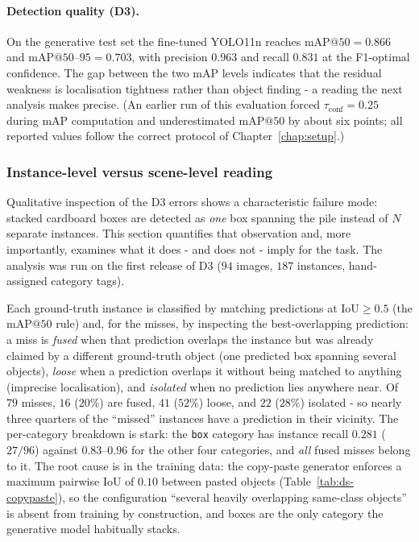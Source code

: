 \paragraph{Detection quality (D3).} On the generative test set the fine-tuned
YOLO11n reaches mAP$@50 = 0.866$ and mAP$@50$--$95 = 0.703$, with precision
$0.963$ and recall $0.831$ at the F1-optimal confidence. The gap between the
two mAP levels indicates that the residual weakness is localisation tightness
rather than object finding - a reading the next analysis makes precise. (An
earlier run of this evaluation forced $\tau_{\mathrm{conf}} = 0.25$ during mAP
computation and underestimated mAP$@50$ by about six points; all reported
values follow the correct protocol of Chapter~\ref{chap:setup}.)

\subsubsection{Instance-level versus scene-level reading}
\label{sssec:p1-metrics}

Qualitative inspection of the D3 errors shows a characteristic failure mode:
stacked cardboard boxes are detected as \emph{one} box spanning the pile
instead of $N$ separate instances. This section quantifies that observation
and, more importantly, examines what it does - and does not - imply for the
task. The analysis was run on the first release of D3 ($94$ images, $187$
instances, hand-assigned category tags).

Each ground-truth instance is classified by matching predictions at
$\mathrm{IoU} \geq 0.5$ (the mAP$@50$ rule) and, for the misses, by inspecting
the best-overlapping prediction: a miss is \emph{fused} when that prediction
overlaps the instance but was already claimed by a different ground-truth
object (one predicted box spanning several objects), \emph{loose} when a
prediction overlaps it without being matched to anything (imprecise
localisation), and \emph{isolated} when no prediction lies anywhere near.
Of $79$ misses, $16$ ($20\%$) are fused, $41$ ($52\%$) loose, and $22$
($28\%$) isolated - so nearly three quarters of the ``missed'' instances have
a prediction in their vicinity. The per-category breakdown is stark: the
\texttt{box} category has instance recall $0.281$ ($27/96$) against
$0.83$--$0.96$ for the other four categories, and \emph{all} fused misses
belong to it. The root cause is in the training data: the copy-paste generator
enforces a maximum pairwise IoU of $0.10$ between pasted objects
(Table~\ref{tab:ds-copypaste}), so the configuration ``several heavily
overlapping same-class objects'' is absent from training by construction, and
boxes are the only category the generative model habitually stacks.

